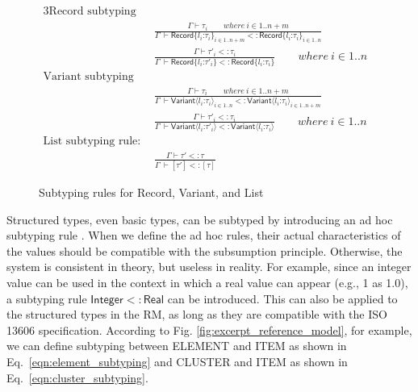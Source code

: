 \documentclass[preprint,3p,onecolumn,times,review]{article}
\begin{document}
{\begin{figure}[!htbp]
  \begin{alignat}{3}
    \text{Record subtyping rules:} \qquad   \nonumber\\
    & \frac{\Gamma \vdash \tau_i \qquad where~i \in 1..n+m} 
           {\Gamma ~ \vdash \mathsf{Record}\{l_i \text{:} \tau_i\}_{i \in 1..n+m}  <: \mathsf{Record}\{l_i \text{:} \tau_i\}_{i \in 1..n}}  & \label{eqn:record_width_subtyping}\\[6pt]
    & \frac{\Gamma \vdash \tau'_i <: \tau_i}
           {\Gamma ~ \vdash \mathsf{Record}\{l_i\text{:}\tau'_i \}  <: \mathsf{Record}\{l_i\text{:}\tau_i\}}  \qquad where~i \in 1..n & \label{eqn:record_depth_subtyping}\\
    \text{Variant subtyping rules:} \qquad   \nonumber\\
    & \frac{\Gamma \vdash \tau_i \qquad where~i \in 1..n+m} 
           {\Gamma ~ \vdash \mathsf{Variant}\langle l_i\text{:} \tau_i\rangle_{i \in 1..n}  <: \mathsf{Variant}\langle l_i\text{:}\tau_i\rangle_{i \in 1..n+m}}  & \label{eqn:variant_breadth_subtyping}\\[6pt]
    & \frac{\Gamma \vdash \tau'_i <: \tau_i}
           {\Gamma ~ \vdash \mathsf{Variant}\langle l_i\text{:}\tau'_i \rangle  <: \mathsf{Variant}\langle l_i\text{:}\tau_i\rangle}  \qquad where~i \in 1..n & \label{eqn:variant_depth_subtyping}\\
    \text{List subtyping rule:} \qquad   \nonumber\\
    & \frac{\Gamma \vdash \tau' <: \tau}
           {\Gamma ~ \vdash [\tau'] <: [\tau]}                                                    & \label{eqn:list_subtyping_rule}
  \end{alignat}
  \caption{Subtyping rules for Record, Variant, and List}\label{fig:subtyping_rules_record_variant_list}
\end{figure}

Structured types, even basic types, can be subtyped by introducing an ad hoc subtyping rule \cite[p.28]{cardelli04:_type_system}.
When we define the ad hoc rules, their actual characteristics of the values should be compatible with the subsumption principle. Otherwise, the system is consistent in theory, but useless in reality.
For example, since an integer value can be used in the context in which a real value can appear (e.g., 1 as 1.0), a subtyping rule $\mathsf{Integer} <: \mathsf{Real}$ can be introduced.
This can also be applied to the structured types in the RM, as long as they are compatible with the ISO 13606 specification. According to Fig. \ref{fig:excerpt_reference_model}, for example, we can define subtyping between {\sf ELEMENT} and {\sf ITEM} as shown in Eq.~\ref{eqn:element_subtyping} and {\sf CLUSTER} and {\sf ITEM} as shown in Eq.~\ref{eqn:cluster_subtyping}.

}
\end{document}
